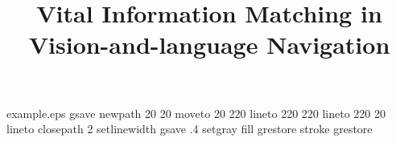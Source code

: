 %
%
%
%
%
\begin{filecontents*}{example.eps}
gsave
newpath
	20 20 moveto
	20 220 lineto
	220 220 lineto
	220 20 lineto
closepath
2 setlinewidth
gsave
	.4 setgray fill
grestore
stroke
grestore
\end{filecontents*}
%
\RequirePackage{fix-cm}
%
\documentclass[smallcondensed]{svjour3}     %
%
\smartqed  %
%
\usepackage{algorithmic}
\usepackage{amsmath,amssymb,amsfonts}
\usepackage{enumerate}
\usepackage{wrapfig}
\usepackage{graphicx}
\usepackage{appendix}
\usepackage{graphicx}
\usepackage{amsmath}
\usepackage{caption}
\usepackage{subfigure}
\usepackage{makecell}
\usepackage{multirow}
\usepackage{booktabs}
\usepackage{threeparttable}
\usepackage{geometry}
\usepackage{float}
\usepackage{indentfirst}
\usepackage[colorlinks,
linkcolor=blue,
anchorcolor=black,
citecolor=blue]{hyperref}
\geometry{top=2.5cm,bottom=2.5cm}
%
%
%
%
%

	
\title{Vital Information Matching in Vision-and-language Navigation %
}
	
